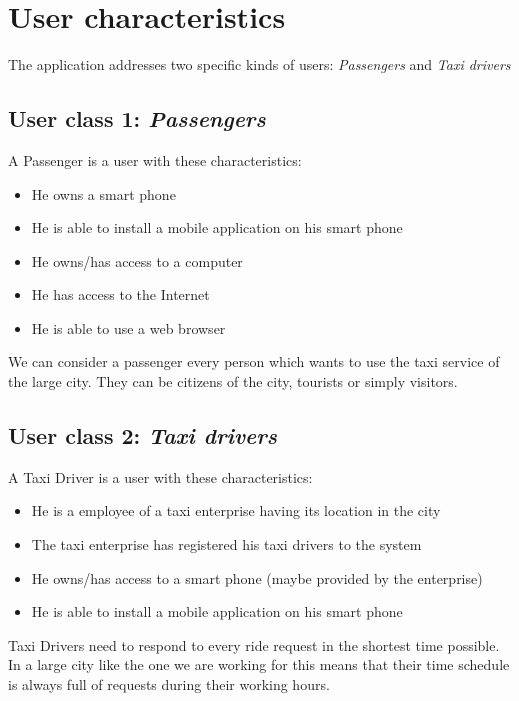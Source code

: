 \section{User characteristics}
The application addresses two specific kinds of users: \textit{Passengers} and \textit{Taxi drivers}
\subsection{User class 1: \textit{Passengers}}
A Passenger is a user with these characteristics:
\begin{itemize}
\item He owns a smart phone
\item He is able to install a mobile application on his smart phone
\item He owns/has access to a computer
\item He has access to the Internet
\item He is able to use a web browser
\end{itemize}
We can consider a passenger every person which wants to use the taxi service of the large city. They can be citizens of the city, tourists or simply visitors.
\subsection{User class 2: \textit{Taxi drivers}}
A Taxi Driver is a user with these characteristics:
\begin{itemize}
\item He is a employee of a taxi enterprise having its location in the city
\item The taxi enterprise has registered his taxi drivers to the system
\item He owns/has access to a smart phone (maybe provided by the enterprise)
\item He is able to install a mobile application on his smart phone
\end{itemize}
Taxi Drivers need to respond to every ride request in the shortest time possible. In a large city like the one we are working for this means that their time schedule is always full of requests during their working hours.
